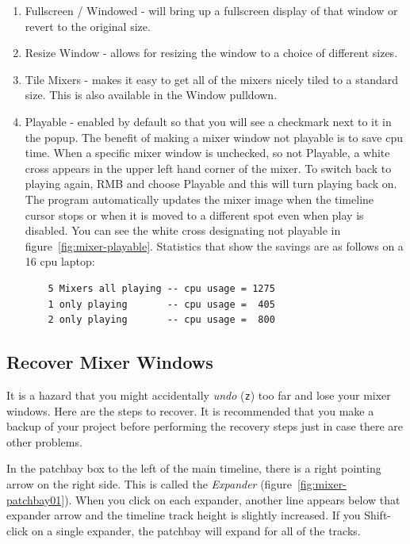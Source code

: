 \begin{enumerate}
	\item Fullscreen / Windowed - will bring up a fullscreen display of that window or revert to the original size.
	\item Resize Window - allows for resizing the window to a choice of different sizes.
	\item Tile Mixers - makes it easy to get all of the mixers nicely tiled to a standard size.
	This is also available in the Window pulldown.
	\item Playable - enabled by default so that you will see a checkmark next to it in the 
	popup.  The benefit of making a mixer window not playable is to save cpu time. When a specific
	mixer window is unchecked, so not Playable, a white cross appears in the upper left hand corner
	of the mixer.  To switch back to playing again, RMB and choose Playable and this will turn
	playing back on. The program automatically updates the mixer image when the timeline cursor
	stops or when it is moved to a different spot even when play is disabled. You can see the
	white cross designating not playable in figure~\ref{fig:mixer-playable}. Statistics that show
	the savings are as follows on a 16 cpu laptop:
	\begin{verbatim}
	5 Mixers all playing -- cpu usage = 1275
	1 only playing       -- cpu usage =  405
	2 only playing       -- cpu usage =  800
	\end{verbatim}
\end{enumerate}


\subsection{Recover Mixer Windows}%
\label{sub:recover_mixer_windows}

It is a hazard that you might accidentally \textit{undo} (\texttt{z}) too far and lose your mixer windows.  Here are the steps to recover.  It is recommended that you make a backup of your project before performing the recovery steps just in case there are other problems.

In the patchbay box to the left of the main timeline, there is a right pointing arrow on the right side.  This is called the \textit{Expander} (figure~\ref{fig:mixer-patchbay01}).  When you click on each expander, another line appears below that expander arrow and the timeline track height is slightly increased.  If you Shift-click on a single expander, the patchbay will expand for all of the tracks.

